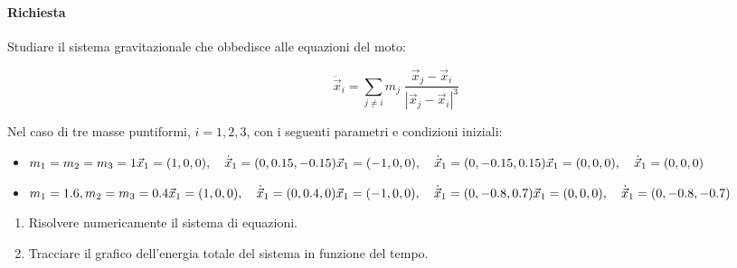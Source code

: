\paragraph{Richiesta}

Studiare il sistema gravitazionale che obbedisce alle equazioni del moto:

\begin{equation}
\ddot{\vec{x}}_i = \sum_{j \neq i} m_j \; \frac{ \vec{x}_j - \vec{x}_i}{|\vec{x}_j - \vec{x}_i|^3}
\end{equation}

Nel caso di tre masse puntiformi, $i = 1, 2, 3$, con i seguenti parametri e condizioni iniziali:

\begin{itemize}
    \item 
        \quad\parbox{\linewidth}{
            \begin{math}
            m_1 = m_2 = m_3 = 1 \\ 
            \vec{x}_1 = (1, 0, 0), \quad \dot{\vec{x}}_1 = (0, 0.15, -0.15) \\  
            \vec{x}_1 = (-1, 0, 0), \quad \dot{\vec{x}}_1 = (0, -0.15, 0.15) \\ 
            \vec{x}_1 = (0, 0, 0), \quad \dot{\vec{x}}_1 = (0, 0, 0)  
            \end{math}
            \\
        }
    \item 
        \quad\parbox{\linewidth}{
            \begin{math}
            m_1 = 1.6, m_2 = m_3 = 0.4 \\ 
            \vec{x}_1 = (1, 0, 0), \quad \dot{\vec{x}}_1 = (0, 0.4, 0) \\  
            \vec{x}_1 = (-1, 0, 0), \quad \dot{\vec{x}}_1 = (0, -0.8, 0.7) \\ 
            \vec{x}_1 = (0, 0, 0), \quad \dot{\vec{x}}_1 = (0, -0.8, -0.7)  
            \end{math}
        }
\end{itemize}

\begin{enumerate}
\item Risolvere numericamente il sistema di equazioni.
\item Tracciare il grafico dell'energia totale del sistema in funzione del tempo.
\end{enumerate}
